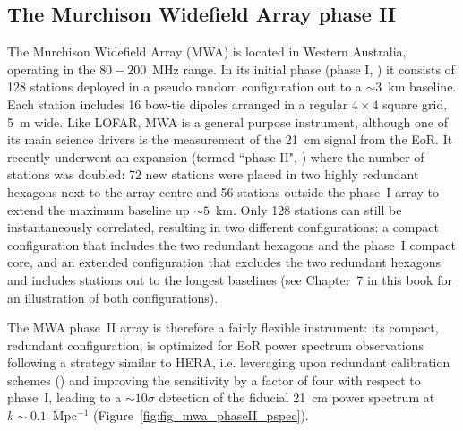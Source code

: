 \subsection{The Murchison Widefield Array phase II}

The Murchison Widefield Array (MWA) is located in Western Australia, operating in the $80-200$~MHz range. In its initial phase (phase I, \cite{tingay13}) it consists of 128 stations deployed in a pseudo random configuration out to a $\sim 3$~km baseline. Each station includes 16 bow-tie dipoles arranged in a regular $4 \times 4$ square grid, 5~m wide. Like LOFAR, MWA is a general purpose instrument, although one of its main science drivers is the measurement of the 21~cm signal from the EoR. It recently underwent an expansion (termed ``phase II", \cite{wayth18}) where the number of stations was doubled: 72 new stations were placed in two highly redundant hexagons next to the array centre and 56 stations outside the phase~I array to extend the maximum baseline up $\sim 5$~km. Only 128 stations can still be instantaneously correlated, resulting in two different configurations: a compact configuration that includes the two redundant hexagons and the phase~I compact core, and an extended configuration that excludes the two redundant hexagons and includes stations out to the longest baselines (see Chapter~7 in this book for an illustration of both configurations).

The MWA phase~II array is therefore a fairly flexible instrument: its compact, redundant configuration, is optimized for EoR power spectrum observations following a strategy similar to HERA, i.e. leveraging upon redundant calibration schemes (\cite{li18}) and improving the sensitivity by a factor of four with respect to phase~I, leading to a $\sim 10\sigma$ detection of the fiducial 21~cm power spectrum at $k \sim 0.1$~Mpc$^{-1}$ (Figure~\ref{fig:fig_mwa_phaseII_pspec}).

